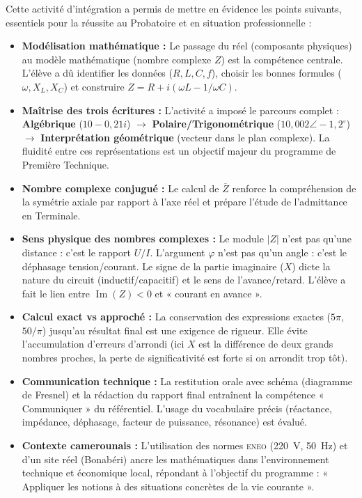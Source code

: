 \documentclass[11pt]{article}
\newcounter{popsec}
\newcounter{popsub}
\newcommand{\courssub}[1]{%
  \stepcounter{popsub}%
  \par\vspace{9pt}\noindent{\popxbold\fontsize{11.5}{13}\selectfont\color{popink}{\color{poporange}\thepopsec.\thepopsub}\hspace{6pt}#1}\par\nopagebreak\vspace{4pt}
}
\begin{document}
\courssub{Bilan de l'activité}

Cette activité d'intégration a permis de mettre en évidence les points suivants, essentiels pour la réussite au Probatoire et en situation professionnelle :

\begin{aretenir}
\begin{itemize}
    \item \textbf{Modélisation mathématique :} Le passage du réel (composants physiques) au modèle mathématique (nombre complexe $Z$) est la compétence centrale. L'élève a dû identifier les données ($R, L, C, f$), choisir les bonnes formules ($\omega, X_L, X_C$) et construire $Z = R + i(\omega L - 1/\omega C)$.
    \item \textbf{Maîtrise des trois écritures :} L'activité a imposé le parcours complet : \textbf{Algébrique} ($10 - 0,21i$) $\to$ \textbf{Polaire/Trigonométrique} ($10,002 \angle -1,2^\circ$) $\to$ \textbf{Interprétation géométrique} (vecteur dans le plan complexe). La fluidité entre ces représentations est un objectif majeur du programme de Première Technique.
    \item \textbf{Nombre complexe conjugué :} Le calcul de $\overline{Z}$ renforce la compréhension de la symétrie axiale par rapport à l'axe réel et prépare l'étude de l'admittance en Terminale.
    \item \textbf{Sens physique des nombres complexes :} Le module $|Z|$ n'est pas qu'une distance : c'est le rapport $U/I$. L'argument $\varphi$ n'est pas qu'un angle : c'est le déphasage tension/courant. Le signe de la partie imaginaire ($X$) dicte la nature du circuit (inductif/capacitif) et le sens de l'avance/retard. L'élève a fait le lien entre $\operatorname{Im}(Z) < 0$ et « courant en avance ».
    \item \textbf{Calcul exact vs approché :} La conservation des expressions exactes ($5\pi$, $50/\pi$) jusqu'au résultat final est une exigence de rigueur. Elle évite l'accumulation d'erreurs d'arrondi (ici $X$ est la différence de deux grands nombres proches, la perte de significativité est forte si on arrondit trop tôt).
    \item \textbf{Communication technique :} La restitution orale avec schéma (diagramme de Fresnel) et la rédaction du rapport final entraînent la compétence « Communiquer » du référentiel. L'usage du vocabulaire précis (réactance, impédance, déphasage, facteur de puissance, résonance) est évalué.
    \item \textbf{Contexte camerounais :} L'utilisation des normes \textsc{eneo} (\SI{220}{V}, \SI{50}{Hz}) et d'un site réel (Bonabéri) ancre les mathématiques dans l'environnement technique et économique local, répondant à l'objectif du programme : « Appliquer les notions à des situations concrètes de la vie courante ».
\end{itemize}
\end{aretenir}
\end{document}
